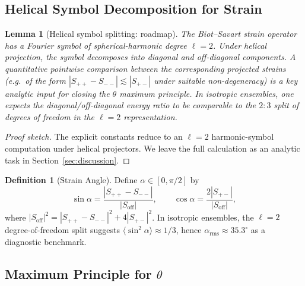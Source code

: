 \documentclass[12pt,a4paper]{article}
\newtheorem{lemma}[theorem]{Lemma}
\theoremstyle{definition}
\newtheorem{definition}[theorem]{Definition}
\begin{document}
\subsection{Helical Symbol Decomposition for Strain}

\begin{lemma}[Helical symbol splitting: roadmap]\label{lem:pythag}
The Biot--Savart strain operator has a Fourier symbol of spherical-harmonic degree $\ell=2$.
Under helical projection, the symbol decomposes into diagonal and off-diagonal components.
A quantitative pointwise comparison between the corresponding projected strains
(e.g.\ of the form $|S_{++}-S_{--}|\lesssim |S_{+-}|$ under suitable non-degeneracy)
is a key analytic input for closing the $\theta$ maximum principle.
In isotropic ensembles, one expects the diagonal/off-diagonal energy ratio to be comparable
to the $2:3$ split of degrees of freedom in the $\ell=2$ representation.
\end{lemma}

\begin{proof}[Proof sketch]
The explicit constants reduce to an $\ell=2$ harmonic-symbol computation under helical projectors.
We leave the full calculation as an analytic task in Section~\ref{sec:discussion}.
\end{proof}

\begin{definition}[Strain Angle]
Define $\alpha \in [0, \pi/2]$ by
\begin{equation}
  \sin\alpha = \frac{|S_{++} - S_{--}|}{|S_{\mathrm{off}}|}, \qquad
  \cos\alpha = \frac{2|S_{+-}|}{|S_{\mathrm{off}}|},
\end{equation}
where $|S_{\mathrm{off}}|^2 = |S_{++}-S_{--}|^2 + 4|S_{+-}|^2$. In isotropic ensembles, the $\ell=2$ degree-of-freedom split suggests $\langle\sin^2\alpha\rangle \approx 1/3$, hence $\alpha_{\mathrm{rms}} \approx 35.3^\circ$ as a diagnostic benchmark.
\end{definition}

\subsection{Maximum Principle for $\theta$}
\end{document}
